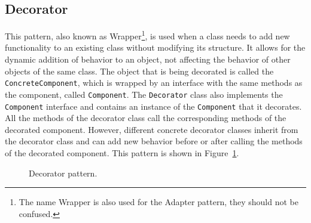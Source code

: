 \subsection{Decorator}

This pattern, also known as Wrapper\footnote{The name Wrapper is also used for the Adapter pattern, they should not be confused.}, is used when a class needs to add new functionality to an existing class without modifying its structure. It allows for the dynamic addition of behavior to an object, not affecting the behavior of other objects of the same class. The object that is being decorated is called the \texttt{ConcreteComponent}, which is wrapped by an interface with the same methods as the component, called \texttt{Component}. The \texttt{Decorator} class also implements the \texttt{Component} interface and contains an instance of the \texttt{Component} that it decorates. All the methods of the decorator class call the corresponding methods of the decorated component. However, different concrete decorator classes inherit from the decorator class and can add new behavior before or after calling the methods of the decorated component. This pattern is shown in Figure~\ref{fig:decorator}.
\begin{figure}
    \centering
    \caption{Decorator pattern.}
    \label{fig:decorator}
\end{figure}

